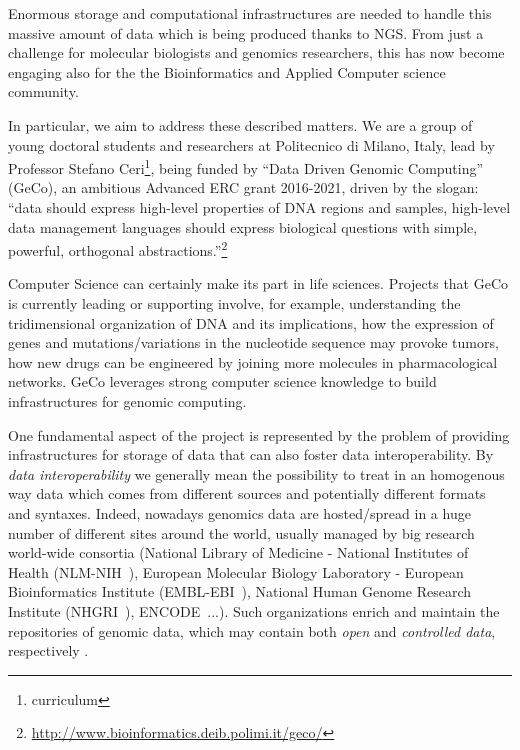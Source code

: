 \documentclass[journal]{IEEEtran}
\begin{document}
Enormous storage and computational infrastructures are needed to handle this massive amount of data which is being produced thanks to NGS. From just a challenge for molecular biologists and genomics researchers, this has now become engaging also for the the Bioinformatics and Applied Computer science community.


In particular, we aim to address these described matters. We are a group of young doctoral students and researchers at Politecnico di Milano, Italy, lead by Professor Stefano Ceri\footnote{curriculum}, being funded by ``Data Driven Genomic Computing'' (GeCo), an ambitious Advanced ERC grant 2016-2021, driven by the slogan: ``data should express high-level properties of DNA regions and samples, high-level data management languages should express biological questions with simple, powerful, orthogonal abstractions.''\footnote{\url{http://www.bioinformatics.deib.polimi.it/geco/}}

Computer Science can certainly make its part in life sciences. Projects that GeCo is currently leading or supporting involve, for example, understanding the tridimensional organization of DNA and its implications, how the expression of genes and mutations/variations in the nucleotide sequence may provoke tumors, how new drugs can be engineered by joining more molecules in pharmacological networks. 
GeCo leverages strong computer science knowledge to build infrastructures for genomic computing.


One fundamental aspect of the project is represented by the problem of providing infrastructures for storage of data that can also foster data interoperability.
By \textit{data interoperability} we generally mean the possibility to treat in an homogenous way data which comes from different sources and potentially different formats and syntaxes.
Indeed, nowadays genomics data are hosted/spread in a huge number of different sites around the world, usually managed by big research world-wide consortia (National Library of Medicine - National Institutes of Health (NLM-NIH~\cite{}), European Molecular Biology Laboratory  - European Bioinformatics Institute (EMBL-EBI~\cite{}), National Human Genome Research Institute (NHGRI~\cite{}), ENCODE~\cite{}...). Such organizations enrich and maintain the repositories of genomic data, which may contain both \textit{open} and \textit{controlled data}, respectively .
\end{document}
